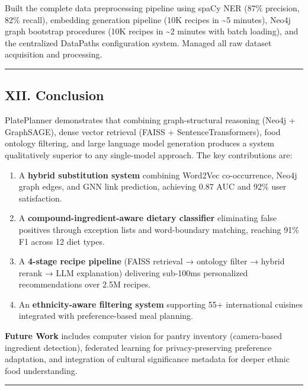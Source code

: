 \documentclass[
  10pt,
]{article}
\providecommand{\tightlist}{%
  \setlength{\itemsep}{0pt}\setlength{\parskip}{0pt}}
\begin{document}
Built the complete data preprocessing pipeline using spaCy NER (87\%
precision, 82\% recall), embedding generation pipeline (10K recipes in
\textasciitilde5 minutes), Neo4j graph bootstrap procedures (10K recipes
in \textasciitilde2 minutes with batch loading), and the centralized
DataPaths configuration system. Managed all raw dataset acquisition and
processing.

\begin{center}\rule{0.5\linewidth}{0.5pt}\end{center}

\subsection{XII. Conclusion}\label{xii.-conclusion}

PlatePlanner demonstrates that combining graph-structural reasoning
(Neo4j + GraphSAGE), dense vector retrieval (FAISS +
SentenceTransformers), food ontology filtering, and large language model
generation produces a system qualitatively superior to any single-model
approach. The key contributions are:

\begin{enumerate}
\def\labelenumi{\arabic{enumi}.}
\tightlist
\item
  A \textbf{hybrid substitution system} combining Word2Vec
  co-occurrence, Neo4j graph edges, and GNN link prediction, achieving
  0.87 AUC and 92\% user satisfaction.
\item
  A \textbf{compound-ingredient-aware dietary classifier} eliminating
  false positives through exception lists and word-boundary matching,
  reaching 91\% F1 across 12 diet types.
\item
  A \textbf{4-stage recipe pipeline} (FAISS retrieval → ontology filter
  → hybrid rerank → LLM explanation) delivering sub-100ms personalized
  recommendations over 2.5M recipes.
\item
  An \textbf{ethnicity-aware filtering system} supporting 55+
  international cuisines integrated with preference-based meal planning.
\end{enumerate}

\textbf{Future Work} includes computer vision for pantry inventory
(camera-based ingredient detection), federated learning for
privacy-preserving preference adaptation, and integration of cultural
significance metadata for deeper ethnic food understanding.

\begin{center}\rule{0.5\linewidth}{0.5pt}\end{center}
\end{document}
